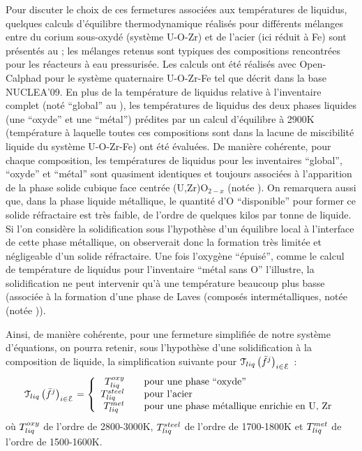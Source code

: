 Pour discuter le choix de ces fermetures associées aux températures de liquidus, quelques calculs d'équilibre thermodynamique réalisés pour différents mélanges entre du corium sous-oxydé (système U-O-Zr) et de l'acier (ici réduit à Fe) sont présentés au  ; les mélanges retenus sont typiques des compositions rencontrées pour les réacteurs à eau pressurisée. Les calculs ont été réalisés avec Open-Calphad pour le système quaternaire U-O-Zr-Fe tel que décrit dans la base NUCLEA'09. En plus de la température de liquidus relative à l'inventaire complet (noté ``global'' au ), les températures de liquidus des deux phases liquides (une ``oxyde'' et une ``métal'') prédites par un calcul d'équilibre à 2900K (température à laquelle toutes ces compositions sont dans la lacune de miscibilité liquide du système U-O-Zr-Fe) ont été évaluées. De manière cohérente, pour chaque composition, les températures de liquidus pour les inventaires ``global'', ``oxyde'' et ``métal'' sont quasiment identiques et toujours associées à l'apparition de la phase solide cubique face centrée (U,Zr)O$_{2-x}$ (notée ). On remarquera aussi que, dans la phase liquide métallique, le quantité d'O ``disponible'' pour former ce solide réfractaire est très faible, de l'ordre de quelques kilos par tonne de liquide. Si l'on considère la solidification sous l'hypothèse d'un équilibre local à l'interface de cette phase métallique, on observerait donc la formation très limitée et négligeable d'un solide réfractaire. Une fois l'oxygène ``épuisé'', comme le calcul de température de liquidus pour l'inventaire ``métal sans O'' l'illustre, la solidification ne peut intervenir qu'à une température beaucoup plus basse (associée à la formation d'une phase de Laves (composés intermétalliques, notée (notée )).

Ainsi, de manière cohérente, pour une fermeture simplifiée de notre système d'équations, on pourra retenir, sous l'hypothèse d'une solidification à la composition de liquide, la simplification suivante pour $\Mc{T}_{liq}\left(\elementMassFraction[j]{}\right)_{i\in\elementSet}$ :
\begin{equation}
 \Mc{T}_{liq}\left(\elementMassFraction[j]{}\right)_{i\in\elementSet} = 
 \left\{\begin{array}{rcl} \temperature[oxy]{liq} & & \text{pour une phase ``oxyde''} \\
                           \temperature[steel]{liq} & & \text{pour l'acier} \\
                           \temperature[met]{liq} & & \text{pour une phase métallique enrichie en U, Zr} 
 \end{array}\right.
\end{equation}
où $\temperature[oxy]{liq}$ de l'ordre de 2800-3000K, $\temperature[steel]{liq}$ de l'ordre de 1700-1800K et $\temperature[met]{liq}$ de l'ordre de 1500-1600K.

